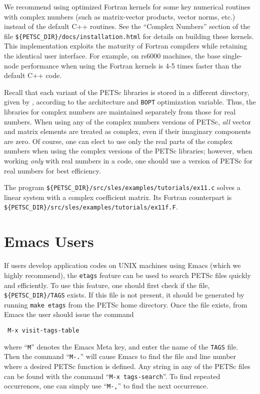 We recommend using optimized Fortran kernels for some key numerical
routines with complex numbers (such as matrix-vector products, vector
norms, etc.) instead of the default C++ routines.  See the ``Complex
Numbers'' section of the file {\tt \$\{PETSC\_DIR\}/docs/installation.html} for
details on building these kernels.  This implementation exploits the
maturity of Fortran compilers while retaining the identical user
interface.  For example, on rs6000 machines, the base single-node
performance when using the Fortran kernels is 4-5 times faster than
the default C++ code.

Recall that each variant of the PETSc libraries is stored in a
different directory, given by
, according to the
architecture and {\tt BOPT} optimization variable.  Thus, the libraries for complex
numbers are maintained separately from those for real
numbers.  When using any of the complex numbers versions of PETSc,
{\em all} vector and matrix elements are treated as complex,
even if their imaginary components are zero.
Of course, one can elect to use only the real parts of the complex
numbers when using the complex versions of the PETSc libraries;
however, when working {\em only} with real numbers in a code,
one should use a version of PETSc for real numbers for best efficiency.

The program {\tt \$\{PETSC\_DIR\}/src/sles/examples/tutorials/ex11.c}
solves a linear system with a complex
coefficient matrix.  Its Fortran counterpart is
{\tt \$\{PETSC\_DIR\}/src/sles/examples/tutorials/ex11f.F}.

\section{Emacs Users}  \label{sec:emacs}

 
If users develop application codes on UNIX machines using Emacs (which we
highly recommend), the {\tt etags} feature can be used to search PETSc 
files quickly and efficiently.  To use this feature, one should 
first check if the file,
{\tt \$\{PETSC\_DIR\}/TAGS} exists.  If this file is
not present, it should be generated by
running {\tt make etags} from the PETSc home directory. 
Once the file exists, from 
Emacs the user should issue
the command 
\begin{verbatim}
 M-x visit-tags-table
\end{verbatim}
 where ``{\tt M}''
denotes the Emacs Meta key, and enter the 
name of the {\tt TAGS} file. Then the command ``{\tt M-.}'' will cause Emacs 
to find the file and line number where a desired PETSc function 
is defined.  Any string in any of the PETSc files can be found with the 
command ``{\tt M-x tags-search}''. To find repeated occurrences, 
one can simply use ``{\tt M-,}'' to find the next occurrence.

